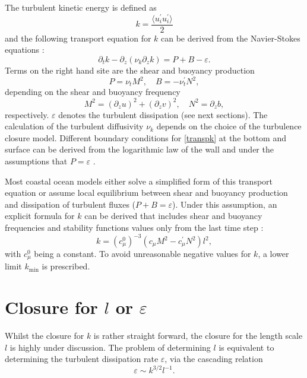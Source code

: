 The turbulent kinetic energy is defined as
\begin{equation}
 \label{TKE}
 k = \frac{\langle u_i^\prime u_i^\prime \rangle}{2}
\end{equation}
and the following transport equation for $k$ can be derived from the 
Navier-Stokes equations \citep[][]{Rodi1993}:
\begin{equation}
 \label{transpk}
 \partial_t k - \partial_z (\nu_k \partial_z k) = P + B -\varepsilon.
\end{equation}
Terms on the right hand site are the shear and buoyancy production
\begin{equation}
 \label{PandB}
 P = \nu_t M^2, \quad B=-\nu^\prime_t N^2, 
\end{equation}
depending on the shear and buoyancy frequency
\begin{equation}
 \label{MundN}
 M^2 = (\partial_z u)^2 + (\partial_z v)^2, \quad N^2 = \partial_z b,
\end{equation}
respectively. $\varepsilon$ denotes the turbulent dissipation (see next 
sections). The calculation of the turbulent diffusivity $\nu_k$ depends on the 
choice of the turbulence closure model. Different boundary conditions for 
\eqref{transpk} at the bottom 
and surface can be derived from the logarithmic law of the wall and under the 
assumptions that $P = \varepsilon$ \citep[][]{gotm1999}.

Most coastal ocean models either solve a simplified form of this transport 
equation or assume local equilibrium between shear and buoyancy production and 
dissipation of turbulent fluxes ($P+B=\varepsilon$). Under this assumption, an 
explicit formula for $k$ can be derived that includes shear and buoyancy 
frequencies and stability functions values only from the last time step 
\citep[][]{UmlaufBurchard2005a}:
\begin{equation}
 \label{explick}
 k = (c_\mu^0)^{-3} (c_\mu M^2 - c_\mu^\prime N^2) l^2,
\end{equation}
 with $c_\mu^0$ being a constant. To avoid unreasonable negative values for 
$k$, a lower limit $k_{\min}$ is prescribed.

\section{Closure for $l$ or $\varepsilon$}

Whilst the closure for $k$ is rather straight forward, the closure for the 
length scale $l$ is highly under discussion. The problem of 
determining $l$ is equivalent to determining the turbulent dissipation rate 
$\varepsilon$, via the cascading relation \citep[][]{UmlaufBurchard2005a} 
\begin{equation}
 \label{cascad}
 \varepsilon \sim k^{3 \slash 2} l^{-1}.
\end{equation}

